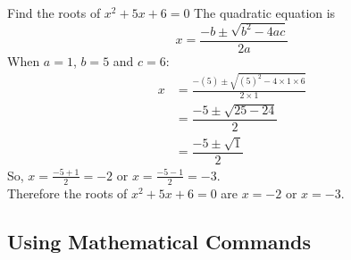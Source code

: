 \documentclass[a4paper,11pt,twoside]{article}
\begin{document}
\begin{center}
	\begin{minipage}{0.7\textwidth}
		\begin{question}[5]
			Find the roots of $x^2 +5x +6 = 0$
			\qpart %
			\qsubpart %
			The quadratic equation is \[
			x=\frac{-b\pm\sqrt{b^2-4ac}}{2a} 
			\]
			\qsubpart %
			When $a=1$, $b=5$ and $c=6$:
			\begin{align}
				x &= \frac{-(5)\pm\sqrt{(5)^2-4\times1\times6}}{2\times1} \\
				&= \dfrac{-5\pm\sqrt{25-24}}{2} \\
				&= \dfrac{-5\pm\sqrt{1}}{2}
			\end{align}
			\qsubpart %
			So, $x=\frac{-5+1}{2}=-2$ or $x=\frac{-5-1}{2}=-3$.\\[0.5cm]
			
			Therefore the roots of $x^2 +5x +6 = 0$ are $x=-2$ or $x=-3$.
		\end{question}
	\end{minipage}
\end{center}

\subsection{Using Mathematical Commands}
\end{document}
